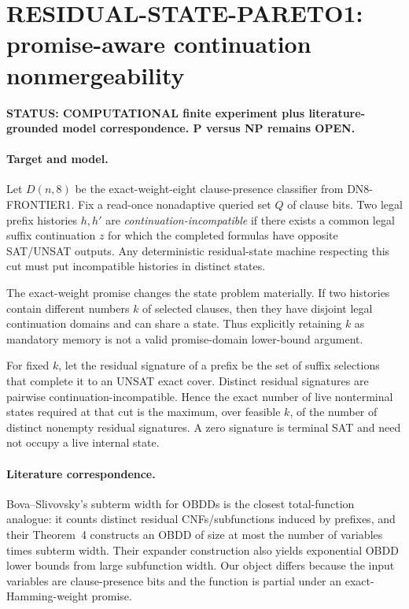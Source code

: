 \section*{RESIDUAL-STATE-PARETO1: promise-aware continuation nonmergeability}

\textbf{STATUS: COMPUTATIONAL finite experiment plus literature-grounded model correspondence. P versus NP remains OPEN.}

\paragraph{Target and model.}
Let \(D(n,8)\) be the exact-weight-eight clause-presence classifier from DN8-FRONTIER1.
Fix a read-once nonadaptive queried set \(Q\) of clause bits. Two legal prefix histories
\(h,h'\) are \emph{continuation-incompatible} if there exists a common legal suffix
continuation \(z\) for which the completed formulas have opposite SAT/UNSAT outputs.
Any deterministic residual-state machine respecting this cut must put incompatible histories
in distinct states.

The exact-weight promise changes the state problem materially. If two histories contain
different numbers \(k\) of selected clauses, then they have disjoint legal continuation
domains and can share a state. Thus explicitly retaining \(k\) as mandatory memory is not a
valid promise-domain lower-bound argument.

For fixed \(k\), let the residual signature of a prefix be the set of suffix selections that
complete it to an UNSAT exact cover. Distinct residual signatures are pairwise
continuation-incompatible. Hence the exact number of live nonterminal states required at
that cut is the maximum, over feasible \(k\), of the number of distinct nonempty residual
signatures. A zero signature is terminal SAT and need not occupy a live internal state.

\paragraph{Literature correspondence.}
Bova--Slivovsky's subterm width for OBDDs is the closest total-function analogue: it counts
distinct residual CNFs/subfunctions induced by prefixes, and their Theorem~4 constructs an
OBDD of size at most the number of variables times subterm width. Their expander
construction also yields exponential OBDD lower bounds from large subfunction width.
Our object differs because the input variables are clause-presence bits and the function is
partial under an exact-Hamming-weight promise.

